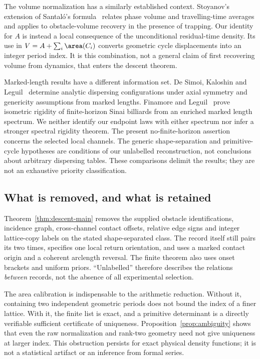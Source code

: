 The volume normalization has a similarly established context. Stoyanov's
extension of Santal\'o's formula~\cite{Santalo} relates phase volume and
travelling-time averages and applies to obstacle-volume recovery in the
presence of trapping. Our identity for $A$ is instead a local consequence
of the unconditional residual-time density. Its use in
$V=A+\sum_i\area(C_i)$ converts geometric cycle displacements into
an integer period index. It is this combination, not a general claim
of first recovering volume from dynamics, that enters the descent theorem.

Marked-length results have a different information set. De Simoi, Kaloshin
and Leguil~\cite{DSKL} determine analytic dispersing configurations under
axial symmetry and genericity assumptions from marked lengths. Finamore
and Leguil~\cite{FL} prove isometric rigidity of finite-horizon Sinai
billiards from an enriched marked length spectrum. We neither identify
our endpoint laws with either spectrum nor infer a stronger spectral
rigidity theorem. The present no-finite-horizon assertion concerns the
selected local channels. The generic shape-separation and primitive-cycle
hypotheses are conditions of our unlabelled reconstruction, not conclusions
about arbitrary dispersing tables. These comparisons delimit the results;
they are not an exhaustive priority classification.

\subsection{What is removed, and what is retained}
Theorem~\ref{thm:descent-main} removes the supplied obstacle identifications,
incidence graph, cross-channel contact offsets, relative edge signs and
integer lattice-copy labels on the stated shape-separated class. The
record itself still pairs its two times, specifies one local return
orientation, and uses a marked contact origin and a coherent arclength
reversal. The finite theorem also uses onset brackets and uniform priors.
``Unlabelled'' therefore describes the relations \emph{between} records,
not the absence of all experimental selection.

The area calibration is indispensable to the arithmetic reduction.
Without it, containing two independent geometric periods does not bound
the index of a finer lattice. With it, the finite list is exact, and a
primitive determinant is a directly verifiable sufficient certificate
of uniqueness. Proposition~\ref{prop:ambiguity} shows that even the raw
normalization and rank-two geometry need not give uniqueness at larger
index. This obstruction persists for exact physical density functions;
it is not a statistical artifact or an inference from formal series.

